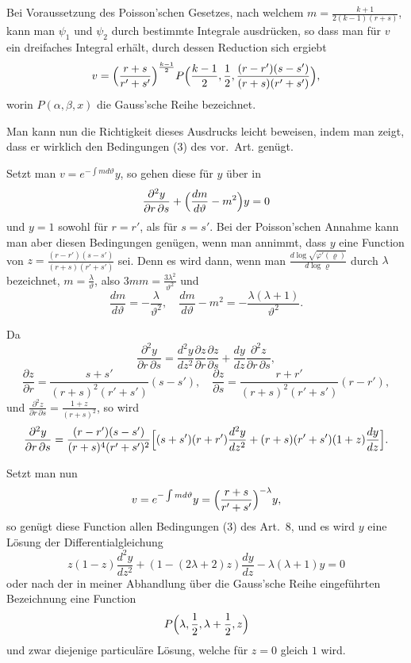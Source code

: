 \documentclass[12pt,a4paper]{article}
\begin{document}
Bei Voraussetzung des Poisson'schen Gesetzes, nach welchem $m = \frac{k+1}{2(k-1)(r+s)}$, kann man $\psi_{1}$ und $\psi_{2}$ durch bestimmte Integrale ausdr\"ucken, so dass man f\"ur $v$ ein dreifaches Integral erh\"alt, durch dessen Reduction sich ergiebt
\[
v = \Bigl(\frac{r+s}{r'+s'}\Bigr)^{\frac{k-1}{2}}P\Bigl(\frac{k-1}{2}, \frac{1}{2}, \frac{(r-r')(s-s')}{(r+s)(r'+s')}\Bigr),
\]
worin $P(\alpha, \beta, x)$ die Gauss'sche Reihe bezeichnet.

Man kann nun die Richtigkeit dieses Ausdrucks leicht beweisen, indem man zeigt, dass er wirklich den Bedingungen (3) des vor.~Art. gen\"ugt.

Setzt man $v = e^{-\int md\vartheta}y$, so gehen diese f\"ur $y$ \"uber in
\[
\frac{\partial^{2}y}{\partial r\,\partial s} + \Bigl(\frac{dm}{d\vartheta} - m^{2}\Bigr)y = 0
\]
und $y = 1$ sowohl f\"ur $r = r'$, als f\"ur $s = s'$. Bei der Poisson'schen Annahme kann man aber diesen Bedingungen gen\"ugen, wenn man annimmt, dass $y$ eine Function von $z = \frac{(r-r')(s-s')}{(r+s)(r'+s')}$ sei. Denn es wird dann, wenn man $\frac{d\log\sqrt{\varphi'(\varrho)}}{d\log\varrho}$ durch $\lambda$ bezeichnet, $m = \frac{\lambda}{\vartheta}$, also $3mm = \frac{3\lambda^{2}}{\vartheta^{2}}$ und
\[
\frac{dm}{d\vartheta} = -\frac{\lambda}{\vartheta^{2}},\quad\frac{dm}{d\vartheta} - m^{2} = -\frac{\lambda(\lambda+1)}{\vartheta^{2}}.
\]

Da
\[
\frac{\partial^{2}y}{\partial r\,\partial s} = \frac{d^{2}y}{dz^{2}}\frac{\partial z}{\partial r}\frac{\partial z}{\partial s} + \frac{dy}{dz}\frac{\partial^{2}z}{\partial r\,\partial s},
\]
\[
\frac{\partial z}{\partial r} = \frac{s+s'}{(r+s)^{2}(r'+s')}(s-s'),\quad \frac{\partial z}{\partial s} = \frac{r+r'}{(r+s)^{2}(r'+s')}(r-r'),
\]
und $\frac{\partial^{2}z}{\partial r\,\partial s} = \frac{1+z}{(r+s)^{2}}$, so wird
\[
\frac{\partial^{2}y}{\partial r\,\partial s} = \frac{(r-r')(s-s')}{(r+s)^{4}(r'+s')^{2}}\Bigl[(s+s')(r+r')\frac{d^{2}y}{dz^{2}} + (r+s)(r'+s')(1+z)\frac{dy}{dz}\Bigr].
\]

Setzt man nun
\[
v = e^{-\int md\vartheta}y = \Bigl(\frac{r+s}{r'+s'}\Bigr)^{-\lambda}y,
\]
so gen\"ugt diese Function allen Bedingungen (3) des Art.~8, und es wird $y$ eine L\"osung der Differentialgleichung
\[
z(1-z)\frac{d^{2}y}{dz^{2}} + (1 - (2\lambda+2)z)\frac{dy}{dz} - \lambda(\lambda+1)y = 0
\]
oder nach der in meiner Abhandlung \"uber die Gauss'sche Reihe eingef\"uhrten Bezeichnung eine Function
\[
P\Bigl(\lambda, \frac{1}{2}, \lambda + \frac{1}{2}, z\Bigr)
\]
und zwar diejenige particul\"are L\"osung, welche f\"ur $z = 0$ gleich $1$ wird.
\end{document}
